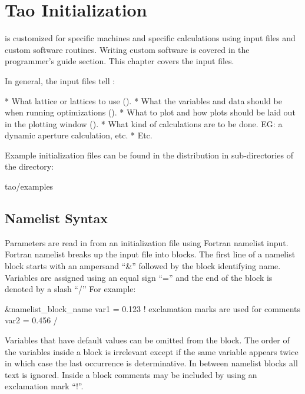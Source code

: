 \chapter{Tao Initialization}
\label{c:init}

\tao is customized for specific machines and specific calculations
using input files and custom software routines. Writing custom
software is covered in the programmer's guide section. This chapter
covers the input files.

In general, the input files tell \tao:
\begin{example}
  * What \bmad lattice or lattices to use ().
  * What the variables and data should be when running optimizations ().
  * What to plot and how plots should be laid out in the plotting window ().
  * What kind of calculations are to be done. EG: a dynamic aperture calculation, etc.
  * Etc.
\end{example}

Example initialization files can be found in the \tao distribution in sub-directories of the
directory:
\begin{example}
  tao/examples
\end{example}

\section{Namelist Syntax}
\label{s:format}

Parameters are read in from an initialization file using Fortran
namelist input. Fortran namelist breaks up the input file into
blocks. The first line of a namelist block starts with an ampersand
``\&'' followed by the block identifying name. Variables are assigned
using an equal sign ``='' and the end of the block is denoted by a
slash ``/'' For example:
\begin{example}
  &namelist_block_name
    var1 = 0.123   ! exclamation marks are used for comments
    var2 = 0.456
  /
\end{example}
Variables that have default values can be omitted from the block.  The
order of the variables inside a block is irrelevant except if the
same variable appears twice in which case the last occurrence is determinative.
In between namelist blocks all text is ignored. Inside a block comments may be
included by using an exclamation mark ``!''.

